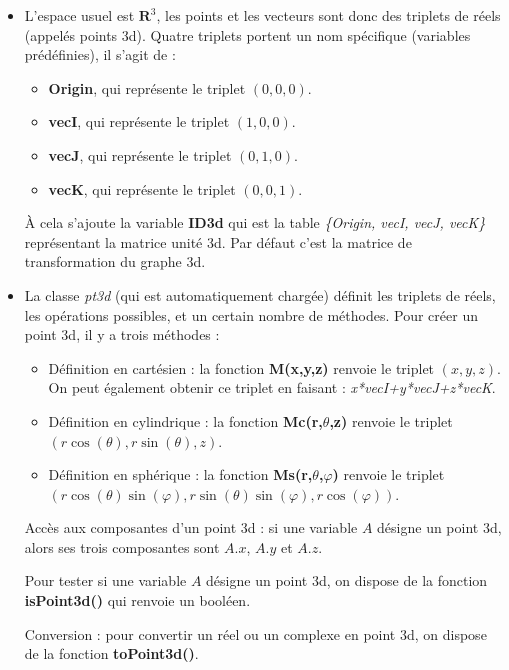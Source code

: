\begin{itemize}
    \item L'espace usuel est $\mathbf R^3$, les points et les vecteurs sont donc des triplets de réels (appelés points 3d). Quatre triplets portent un nom spécifique (variables prédéfinies), il s'agit de :
    \begin{itemize}
        \item \textbf{Origin}, qui représente le triplet $(0,0,0)$.
        \item \textbf{vecI}, qui représente le triplet $(1,0,0)$.
        \item \textbf{vecJ}, qui représente le triplet $(0,1,0)$.
        \item \textbf{vecK}, qui représente le triplet $(0,0,1)$.
    \end{itemize}
    À cela s'ajoute la variable \textbf{ID3d} qui est la table \emph{\{Origin, vecI, vecJ, vecK\}} représentant la matrice unité 3d. Par défaut c'est la matrice de transformation du graphe 3d.
    \item La classe \emph{pt3d} (qui est automatiquement chargée) définit les triplets de réels, les opérations possibles, et un certain nombre de méthodes. Pour créer un point 3d, il y a trois méthodes :
        \begin{itemize}
            \item Définition en cartésien : la fonction \textbf{M(x,y,z)} renvoie le triplet $(x,y,z)$. On peut également obtenir ce triplet en faisant : \emph{x*vecI+y*vecJ+z*vecK}.
            \item Définition en cylindrique : la fonction \textbf{Mc(r,$\theta$,z)} renvoie le triplet $(r\cos(\theta),r\sin(\theta),z)$.
            \item Définition en sphérique : la fonction \textbf{Ms(r,$\theta$,$\varphi$)} renvoie le triplet $(r\cos(\theta)\sin(\varphi), r\sin(\theta)\sin(\varphi),r\cos(\varphi))$.
        \end{itemize}
    Accès aux composantes d'un point 3d : si une variable $A$ désigne un point 3d, alors ses trois composantes sont $A.x$, $A.y$ et $A.z$.
    
    Pour tester si une variable $A$ désigne un point 3d, on dispose de la fonction \textbf{isPoint3d()} qui renvoie un booléen.
    
    Conversion : pour convertir un réel ou un complexe en point 3d, on dispose de la fonction \textbf{toPoint3d()}.
\end{itemize}

